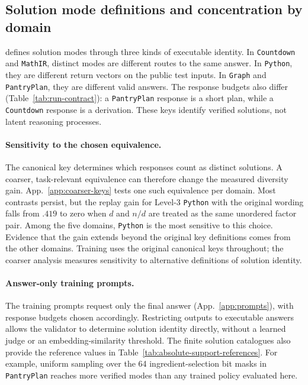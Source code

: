\subsection{Solution mode definitions and concentration by domain}
\label{app:mode-keying}

\mb{} defines solution modes through three kinds of executable identity.
In \texttt{Countdown} and \texttt{MathIR}, distinct modes are different routes to the same
answer. In \texttt{Python}, they are different return vectors on the public test
inputs. In \texttt{Graph} and \texttt{PantryPlan}, they are different valid answers. The
response budgets also differ (Table~\ref{tab:run-contract}): a \texttt{PantryPlan}
response is a short plan, while a \texttt{Countdown} response is a derivation.
These keys identify verified solutions, not latent reasoning processes.

\paragraph{Sensitivity to the chosen equivalence.}
The canonical key determines which responses count as distinct solutions.
A coarser, task-relevant equivalence can therefore change the measured
diversity gain. App.~\ref{app:coarser-keys} tests one such equivalence per
domain. Most contrasts persist, but the replay gain for Level-3
\texttt{Python} with the original wording falls from $.419$ to zero when
$d$ and $n/d$ are treated as the same unordered factor pair. Among the five
domains, \texttt{Python} is the most sensitive to this choice. Evidence that
the gain extends beyond the original key definitions comes from the other
domains. Training uses the original canonical keys throughout; the coarser
analysis measures sensitivity to alternative definitions of solution identity.

\paragraph{Answer-only training prompts.}
The training prompts request only the final answer
(App.~\ref{app:prompts}), with response budgets chosen accordingly.
Restricting outputs to executable answers allows the validator to determine
solution identity directly, without a learned judge or an embedding-similarity
threshold. The finite solution catalogues also provide the reference values
in Table~\ref{tab:absolute-support-references}. For example, uniform sampling
over the 64 ingredient-selection bit masks in \texttt{PantryPlan} reaches
more verified modes than any trained policy evaluated here.


